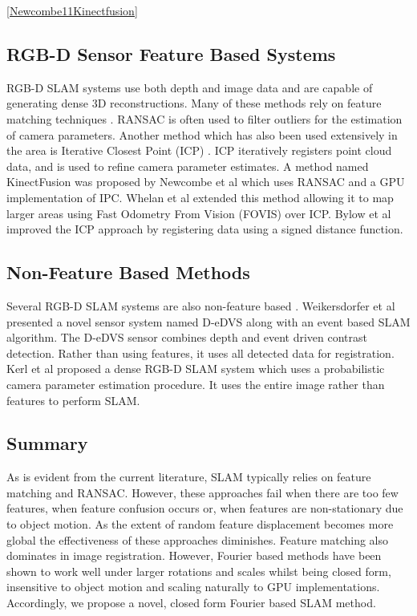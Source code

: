 \ref{Newcombe11Kinectfusion}

\subsection{RGB-D Sensor Feature Based Systems}
RGB-D SLAM systems use both depth and image data and are capable of generating dense 3D reconstructions. Many of these methods rely on feature matching techniques \cite{Engelhard11Real,Henry10Rgb,Endres12Evaluation}. RANSAC is often used to filter outliers for the estimation of camera parameters\cite{Engelhard11Real,Henry10Rgb,Endres12Evaluation}. Another method which has also been used extensively in the area is Iterative Closest Point (ICP) \cite{Engelhard11Real,Henry10Rgb,Bylow13Real,Newcombe11Kinectfusion,Stuckler12Robust,Izadi11Kinectfusion}. ICP iteratively registers point cloud data, and is used to refine camera parameter estimates. A method named KinectFusion was proposed by Newcombe et al \cite{Newcombe11Kinectfusion} which uses RANSAC and a GPU implementation of IPC. Whelan et al \cite{Whelan12Kintinuous} extended this method allowing it to map larger areas using Fast Odometry From Vision (FOVIS) over ICP. Bylow et al \cite{Bylow13Real} improved the ICP approach by registering data using a signed distance function.
\subsection{Non-Feature Based Methods}
Several RGB-D SLAM systems are also non-feature based \cite{Weikersdorfer14Event,Izadi11Kinectfusion,Kerl13Dense}. Weikersdorfer et al \cite{Weikersdorfer14Event} presented a novel sensor system named D-eDVS along with an event based SLAM algorithm. The D-eDVS sensor combines depth and event driven contrast detection. Rather than using features, it uses all detected data for registration. Kerl et al \cite{Kerl13Dense} proposed a dense RGB-D SLAM system which uses a probabilistic camera parameter estimation procedure. It uses the entire image rather than features to perform SLAM.
\subsection{Summary}
As is evident from the current literature, SLAM typically relies on feature matching and RANSAC. However, these approaches fail when there are too few features, when feature confusion occurs or, when features are non-stationary due to object motion. As the extent of random feature displacement becomes more global the effectiveness of these approaches diminishes. Feature matching also dominates in image registration. However, Fourier based methods have been shown to work well under larger rotations and scales \cite{Gonzalez11Improving} whilst being closed form, insensitive to object motion and scaling naturally to GPU implementations. Accordingly, we propose a novel, closed form Fourier based SLAM method.

